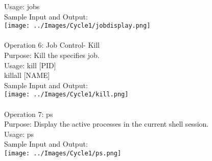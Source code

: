 \documentclass[10pt,a4paper]{report}
\begin{document}
Usage: jobs\\
Sample Input and Output:\\
\texttt{[image: ../Images/Cycle1/jobdisplay.png]}\\
\\
Operation 6: Job Control- Kill\\
Purpose: Kill the specifies job.\\
Usage: kill [PID]\\
killall [NAME]\\
Sample Input and Output:\\
\texttt{[image: ../Images/Cycle1/kill.png]}\\
\\
Operation 7: ps\\
Purpose: Display the active processes in the current shell session.\\
Usage: ps\\
Sample Input and Output:\\
\texttt{[image: ../Images/Cycle1/ps.png]}\\
\\


\pagebreak
\end{document}

